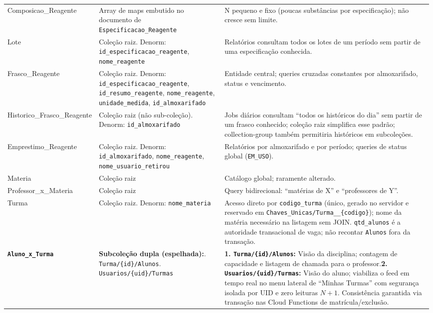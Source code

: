 \begin{longtable}{>{\raggedright\arraybackslash}p{} >{\raggedright\arraybackslash}p{} >{\raggedright\arraybackslash}p{}}
Composicao\_Reagente & Array de maps embutido no documento de \texttt{Especificacao\_Reagente} & N pequeno e fixo (poucas substâncias por especificação); não cresce sem limite.\\
Lote & Coleção raiz. Denorm: \texttt{id\_especificacao\_reagente}, \texttt{nome\_reagente} & Relatórios consultam todos os lotes de um período sem partir de uma especificação conhecida.\\
Frasco\_Reagente & Coleção raiz. Denorm: \texttt{id\_especificacao\_reagente}, \texttt{id\_resumo\_reagente}, \texttt{nome\_reagente}, \texttt{unidade\_medida}, \texttt{id\_almoxarifado} & Entidade central; queries cruzadas constantes por almoxarifado, status e vencimento.\\
Historico\_Frasco\_Reagente & Coleção raiz (não sub-coleção). Denorm: \texttt{id\_almoxarifado} & Jobs diários consultam ``todos os históricos do dia'' sem partir de um frasco conhecido; coleção raiz simplifica esse padrão; collection-group também permitiria históricos em subcoleções.\\
Emprestimo\_Reagente & Coleção raiz. Denorm: \texttt{id\_almoxarifado}, \texttt{nome\_reagente}, \texttt{nome\_usuario\_retirou} & Relatórios por almoxarifado e por período; queries de status global (\texttt{EM\_USO}).\\
Materia & Coleção raiz & Catálogo global; raramente alterado.\\
Professor\_x\_Materia & Coleção raiz & Query bidirecional: ``matérias de X'' e ``professores de Y''.\\
Turma & Coleção raiz. Denorm: \texttt{nome\_materia} & Acesso direto por \texttt{codigo\_turma} (único, gerado no servidor e reservado em \texttt{Chaves\_Unicas/Turma\_\_\{codigo\}}); nome da matéria necessário na listagem sem JOIN. \texttt{qtd\_alunos} é a autoridade transacional de vaga; não recontar \texttt{Alunos} fora da transação.\\
\textbf{\texttt{Aluno\_x\_Turma}} & \textbf{Subcoleção dupla (espelhada):}\newline 1. \nolinkurl{Turma/\{id\}/Alunos}\newline 2. \nolinkurl{Usuarios/\{uid\}/Turmas} & \textbf{1. \nolinkurl{Turma/\{id\}/Alunos}:} Visão da disciplina; contagem de capacidade e listagem de chamada para o professor.\newline \textbf{2. \nolinkurl{Usuarios/\{uid\}/Turmas}:} Visão do aluno; viabiliza o feed em tempo real no menu lateral de ``Minhas Turmas'' com segurança isolada por UID e zero leituras $N+1$. Consistência garantida via transação nas Cloud Functions de matrícula/exclusão.\\

\end{longtable}

